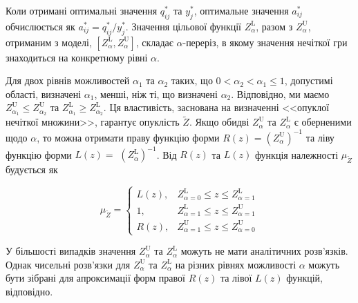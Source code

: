 \documentclass[14pt, a4paper, oneside]{extarticle}
\numberwithin{equation}{section}
\begin{document}
Коли отримані оптимальні значення $q_{i j}^{*}$ та $y_{j}^{*}$, оптимальне значення $a_{i j}^{*}$ обчислюється як $a_{i j}^{*}=q_{i j}^{*} / y_{j}^{*}$. Значення цільової функції $Z_{\alpha}^{\mathrm{L}}$, разом з $Z_{\alpha}^{\mathrm{U}}$, отриманим з моделі, $\left[Z_{\alpha}^{\mathrm{L}}, Z_{\alpha}^{\mathrm{U}}\right]$, складає $\alpha$-переріз, в якому значення нечіткої гри знаходиться на конкретному рівні $\alpha$.

Для двох рівнів можливостей $\alpha_{1}$ та $\alpha_{2}$ таких, що $0<\alpha_{2}<\alpha_{1} \leq 1$, допустимі області, визначені $\alpha_{1}$, менші, ніж ті, що визначені $\alpha_{2}$. Відповідно, ми маємо $Z_{\alpha_{1}}^{\mathrm{U}} \leq Z_{\alpha_{2}}^{\mathrm{U}}$ та $Z_{\alpha_{1}}^{\mathrm{L}} \geq Z_{\alpha_{2}}^{\mathrm{L}}$. Ця властивість, заснована на визначенні <<опуклої нечіткої множини>>, гарантує опуклість $\tilde{Z}$. Якщо обидві $Z_{\alpha}^{\mathrm{U}}$ та $Z_{\alpha}^{\mathrm{L}}$ є оберненими щодо $\alpha$, то можна отримати праву функцію форми $R(z)=\left(Z_{\alpha}^{\mathrm{U}}\right)^{-1}$ та ліву функцію форми $L(z)=$ $\left(Z_{\alpha}^{\mathrm{L}}\right)^{-1}$. Від $R(z)$ та $L(z)$ функція належності $\mu_{\tilde{Z}}$ будується як

\begin{equation}
\mu_{\tilde{Z}}= \begin{cases}L(z), & Z_{\alpha=0}^{\mathrm{L}} \leq z \leq Z_{\alpha=1}^{\mathrm{L}} \\ 1, & Z_{\alpha=1}^{\mathrm{L}} \leq z \leq Z_{\alpha=1}^{\mathrm{U}} \\ R(z), & Z_{\alpha=1}^{\mathrm{U}} \leq z \leq Z_{\alpha=0}^{\mathrm{U}}\end{cases}
\end{equation}

У більшості випадків значення $Z_{\alpha}^{\mathrm{U}}$ та $Z_{\alpha}^{\mathrm{L}}$ можуть не мати аналітичних розв'язків. Однак чисельні розв'язки для $Z_{\alpha}^{\mathrm{U}}$ та $Z_{\alpha}^{\mathrm{L}}$ на різних рівнях можливості $\alpha$ можуть бути зібрані для апроксимації форм правої $R(z)$ та лівої $L(z)$ функцій, відповідно.
\end{document}
